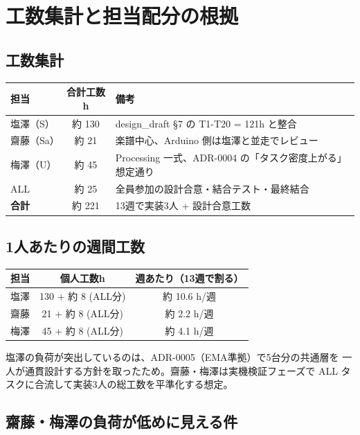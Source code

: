 \documentclass[lualatex,book,paper=a4paper,jafontsize=11pt,jafontscale=1.05]{jlreq}
\begin{document}
\chapter{工数集計と担当配分の根拠}

\section{工数集計}

\begin{center}
\begin{tabular}{lcl}
\toprule
\textbf{担当} & \textbf{合計工数h} & \textbf{備考} \\
\midrule
塩澤（S）   & 約 130 & design\_draft §7 の T1-T20 = 121h と整合 \\
齋藤（Sa）  & 約 21  & 楽譜中心、Arduino 側は塩澤と並走でレビュー \\
梅澤（U）   & 約 45  & Processing 一式、ADR-0004 の「タスク密度上がる」想定通り \\
ALL         & 約 25  & 全員参加の設計合意・結合テスト・最終結合 \\
\midrule
\textbf{合計} & 約 221 & 13週で実装3人 + 設計合意工数 \\
\bottomrule
\end{tabular}
\end{center}

\section{1人あたりの週間工数}

\begin{center}
\begin{tabular}{lcc}
\toprule
\textbf{担当} & \textbf{個人工数h} & \textbf{週あたり（13週で割る）} \\
\midrule
塩澤 & 130 + 約 8 (ALL分) & 約 10.6 h/週 \\
齋藤 & 21 + 約 8 (ALL分) & 約 2.2 h/週 \\
梅澤 & 45 + 約 8 (ALL分) & 約 4.1 h/週 \\
\bottomrule
\end{tabular}
\end{center}

\noindent
塩澤の負荷が突出しているのは、ADR-0005（EMA準拠）で5台分の共通層を
一人が通貫設計する方針を取ったため。齋藤・梅澤は実機検証フェーズで
ALL タスクに合流して実装3人の総工数を平準化する想定。

\section{齋藤・梅澤の負荷が低めに見える件}
\end{document}
